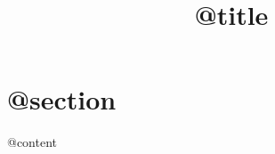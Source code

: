 \documentclass[a4paper]{article}
\title{@title}
\begin{document}
    \maketitle
    \section{@section}
    @content
\end{document}
